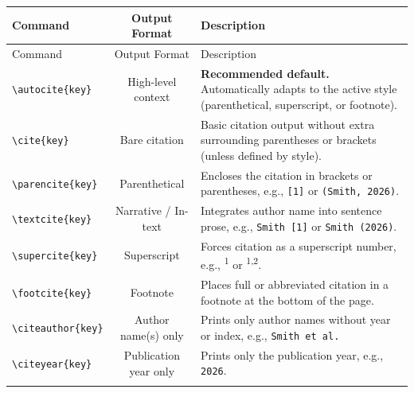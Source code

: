 	\begin{tabularx}{\linewidth}{@{}lcL@{}}
		\caption{Standard \texttt{biblatex} citation commands and descriptions.}
		\label{tab:biblatexcommands} \\
		\toprule
		Command & Output Format & Description \\
		\midrule
		\endfirsthead
		\toprule
		Command & Output Format & Description \\
		\midrule
		\endhead
		\bottomrule
		\endfoot
		\bottomrule
		\endlastfoot
		\texttt{\textbackslash autocite\{key\}}     & High-level context   & \textbf{Recommended default.} Automatically adapts to the active style (parenthetical, superscript, or footnote). \\
		\addlinespace
		
		\texttt{\textbackslash cite\{key\}}         & Bare citation         & Basic citation output without extra surrounding parentheses or brackets (unless defined by style). \\
		\addlinespace
		
		\texttt{\textbackslash parencite\{key\}}    & Parenthetical         & Encloses the citation in brackets or parentheses, e.g., \texttt{[1]} or \texttt{(Smith, 2026)}. \\
		\addlinespace
		
		\texttt{\textbackslash textcite\{key\}}     & Narrative / In-text   & Integrates author name into sentence prose, e.g., \texttt{Smith [1]} or \texttt{Smith (2026)}. \\
		\addlinespace
		
		\texttt{\textbackslash supercite\{key\}}    & Superscript           & Forces citation as a superscript number, e.g., \textsuperscript{1} or \textsuperscript{1,2}. \\
		\addlinespace
		
		\texttt{\textbackslash footcite\{key\}}     & Footnote              & Places full or abbreviated citation in a footnote at the bottom of the page. \\
		\addlinespace
		
		\texttt{\textbackslash citeauthor\{key\}}   & Author name(s) only   & Prints only author names without year or index, e.g., \texttt{Smith et al.} \\
		\addlinespace
		
		\texttt{\textbackslash citeyear\{key\}}     & Publication year only & Prints only the publication year, e.g., \texttt{2026}. \\
		\addlinespace
		

\end{tabularx}
